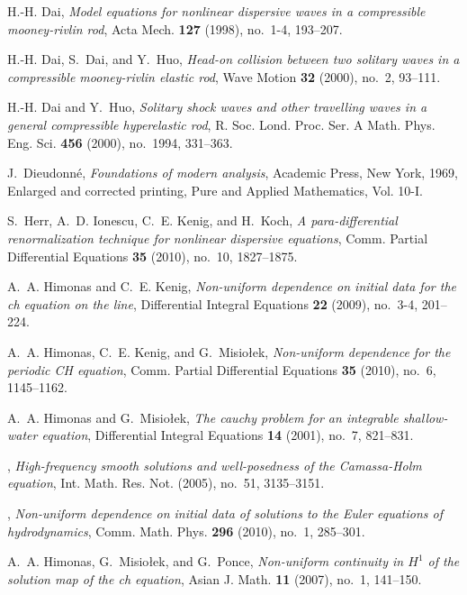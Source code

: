 \documentclass[final,noinfo]{thesis}
\begin{document}
\begin{thebibliography}{100}
H.-H. Dai, \emph{Model equations for nonlinear dispersive waves in a
  compressible mooney-rivlin rod}, Acta Mech. \textbf{127} (1998), no.~1-4,
  193--207.

H.-H. Dai, S.~Dai, and Y.~Huo, \emph{Head-on collision between two solitary
  waves in a compressible mooney-rivlin elastic rod}, Wave Motion \textbf{32}
  (2000), no.~2, 93--111.

H.-H. Dai and Y.~Huo, \emph{Solitary shock waves and other travelling waves in
  a general compressible hyperelastic rod}, R. Soc. Lond. Proc. Ser. A Math.
  Phys. Eng. Sci. \textbf{456} (2000), no.~1994, 331--363.

J.~Dieudonn{{\'e}}, \emph{Foundations of modern analysis}, Academic Press, New
  York, 1969, Enlarged and corrected printing, Pure and Applied Mathematics,
  Vol. 10-I. 

S.~Herr, A.~D. Ionescu, C.~E. Kenig, and H.~Koch, \emph{A para-differential
  renormalization technique for nonlinear dispersive equations}, Comm. Partial
  Differential Equations \textbf{35} (2010), no.~10, 1827--1875.

A.~A. Himonas and C.~E. Kenig, \emph{Non-uniform dependence on initial data for
  the ch equation on the line}, Differential Integral Equations \textbf{22}
  (2009), no.~3-4, 201--224.

A.~A. Himonas, C.~E. Kenig, and G.~Misio{\l}ek, \emph{Non-uniform dependence
  for the periodic {CH} equation}, Comm. Partial Differential Equations
  \textbf{35} (2010), no.~6, 1145--1162. 

A.~A. Himonas and G.~Misio{\l}ek, \emph{The cauchy problem for an integrable
  shallow-water equation}, Differential Integral Equations \textbf{14} (2001),
  no.~7, 821--831.

\bysame, \emph{High-frequency smooth solutions and
  well-posedness of the {C}amassa-{H}olm equation}, Int. Math. Res. Not.
  (2005), no.~51, 3135--3151. 

\bysame, \emph{Non-uniform dependence on initial data
  of solutions to the {E}uler equations of hydrodynamics}, Comm. Math. Phys.
  \textbf{296} (2010), no.~1, 285--301. 

A.~A. Himonas, G.~Misio{\l}ek, and G.~Ponce, \emph{Non-uniform continuity in
  $H^ 1$ of the solution map of the ch equation}, Asian J. Math.
  \textbf{11} (2007), no.~1, 141--150.


\end{thebibliography}
\end{document}
